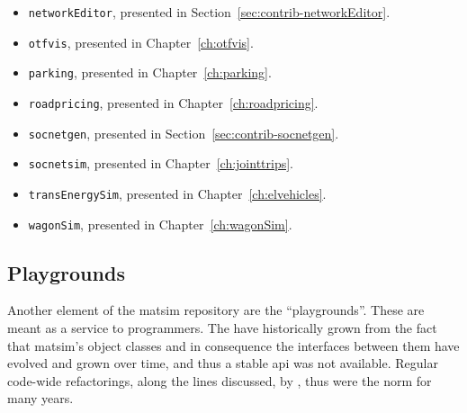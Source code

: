 \begin{itemize}
\item \lstinline{networkEditor}, presented in Section~\ref{sec:contrib-networkEditor}.
\item \lstinline{otfvis}, presented in Chapter~\ref{ch:otfvis}.
\item \lstinline{parking}, presented in Chapter~\ref{ch:parking}.
\item \lstinline{roadpricing}, presented in Chapter~\ref{ch:roadpricing}.
\item \lstinline{socnetgen}, presented in Section~\ref{sec:contrib-socnetgen}.
\item \lstinline{socnetsim}, presented in Chapter~\ref{ch:jointtrips}.
\item \lstinline{transEnergySim}, presented in Chapter~\ref{ch:elvehicles}.
\item \lstinline{wagonSim}, presented in Chapter~\ref{ch:wagonSim}.
\end{itemize}


\subsection{Playgrounds}
Another element of the \gls{matsim} repository are the ``playgrounds''. 
These are meant as a service to programmers. 
The have historically grown from the fact that \gls{matsim}'s object classes and in consequence the interfaces between them have evolved and grown over time, and thus a stable \gls{api} was not available.  Regular code-wide refactorings, along the lines discussed, \eg by \citet{Fowler2004refactoring}, thus were the norm for many years.

